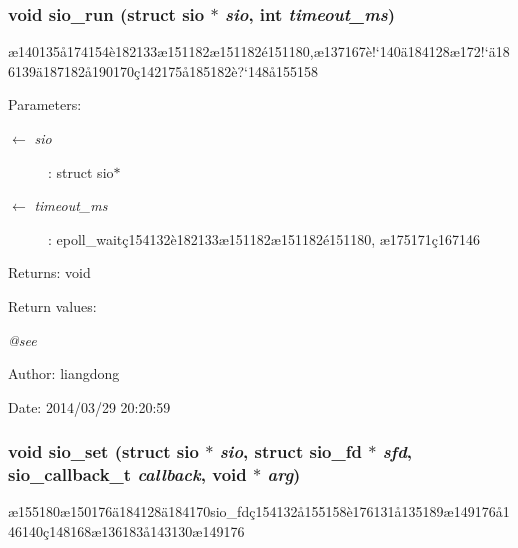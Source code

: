 \subsubsection{\setlength{\rightskip}{0pt plus 5cm}void sio\_\-run (struct sio $\ast$ {\em sio}, int {\em timeout\_\-ms})}\label{sio_8h_a13}


\ae{}140135\aa{}174154\`{e}182133\ae{}151182\ae{}151182\'{e}151180,\ae{}137167\`{e}!`140\"{a}184128\ae{}172!`\"{a}186139\"{a}187182\aa{}190170\c{c}142175\aa{}185182\`{e}?`148\aa{}155158 

\begin{Desc}
\item[Parameters:]
\begin{description}
\item[\mbox{$\leftarrow$} {\em sio}]: struct sio$\ast$ \item[\mbox{$\leftarrow$} {\em timeout\_\-ms}]: epoll\_\-wait\c{c}154132\`{e}182133\ae{}151182\ae{}151182\'{e}151180, \ae{}175171\c{c}167146 \end{description}
\end{Desc}
\begin{Desc}
\item[Returns:]void \end{Desc}
\begin{Desc}
\item[Return values:]
\begin{description}
\item[{\em @see}]\end{description}
\end{Desc}
\begin{Desc}
\item[Author:]liangdong \end{Desc}
\begin{Desc}
\item[Date:]2014/03/29 20:20:59 \end{Desc}
\subsubsection{\setlength{\rightskip}{0pt plus 5cm}void sio\_\-set (struct sio $\ast$ {\em sio}, struct sio\_\-fd $\ast$ {\em sfd}, sio\_\-callback\_\-t {\em callback}, void $\ast$ {\em arg})}\label{sio_8h_a7}


\ae{}155180\ae{}150176\"{a}184128\"{a}184170sio\_\-fd\c{c}154132\aa{}155158\`{e}176131\aa{}135189\ae{}149176\aa{}146140\c{c}148168\ae{}136183\aa{}143130\ae{}149176 

